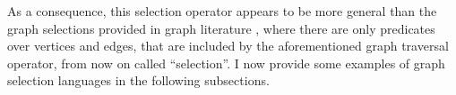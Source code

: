 As a consequence, this selection operator appears to be more general than the graph selections provided in graph literature \cite{apacheflink}, where there are only predicates over vertices and edges, that are included by the aforementioned graph traversal operator, from now on called ``selection''. I now provide some examples of graph selection languages in the following subsections.



